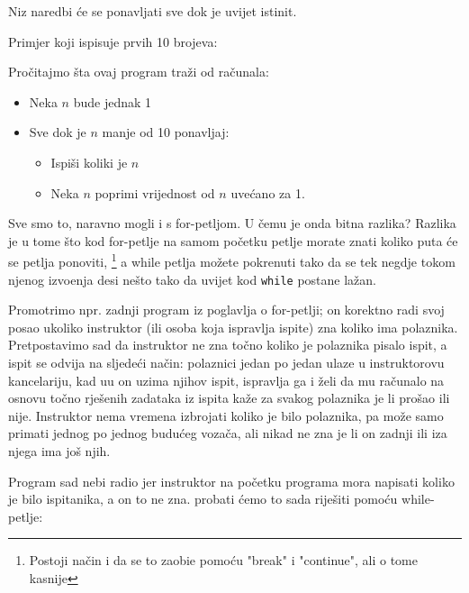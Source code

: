 Niz naredbi \'{c}e se ponavljati sve dok je uvijet istinit. 

Primjer koji ispisuje prvih 10 brojeva:


Pro\v{c}itajmo \v{s}ta ovaj program tra\v{z}i od ra\v{c}unala:
\begin{itemize}
	\item Neka $n$ bude jednak 1
	\item Sve dok je $n$ manje od 10 ponavljaj:
	\begin{itemize}
		\item Ispi\v{s}i koliki je $n$
		\item Neka $n$ poprimi vrijednost od $n$ uve\'{c}ano za 1.
	\end{itemize}
\end{itemize}

Sve smo to, naravno mogli i s for-petljom. U \v{c}emu je onda bitna razlika? Razlika
je u tome \v{s}to kod for-petlje na samom po\v{c}etku petlje morate znati koliko
puta \'{c}e se petlja ponoviti,
\footnote{Postoji na\v{c}in i da se to zaobi\dj{}e pomo\'{c}u "break" i "continue", ali o tome kasnije}
a while petlja mo\v{z}ete pokrenuti tako da se tek negdje tokom njenog izvo\dj{}enja
desi ne\v{s}to tako da uvijet kod \verb"while" postane la\v{z}an.

Promotrimo npr. zadnji program iz poglavlja o for-petlji; on korektno radi svoj posao
ukoliko instruktor (ili osoba koja ispravlja ispite) zna koliko ima polaznika.
Pretpostavimo sad da instruktor ne zna to\v{c}no koliko je polaznika pisalo ispit, a
ispit se odvija na sljede\'{c}i na\v{c}in: polaznici jedan po jedan ulaze u
instruktorovu kancelariju, kad u\dj{}u on uzima njihov ispit, ispravlja ga i
\v{z}eli da mu ra\v{c}unalo na osnovu to\v{c}no rje\v{s}enih zadataka iz ispita
ka\v{z}e za svakog polaznika je li pro\v{s}ao ili nije. Instruktor nema vremena
izbrojati koliko je bilo polaznika, pa mo\v{z}e samo primati jednog po jednog
budu\'{c}eg voza\v{c}a, ali nikad ne zna je li on zadnji ili iza njega ima jo\v{s}
njih.

Program sad nebi radio jer instruktor na po\v{c}etku programa mora napisati koliko
je bilo ispitanika, a on to ne zna. probati \'{c}emo to sada rije\v{s}iti
pomo\'{c}u while-petlje:

